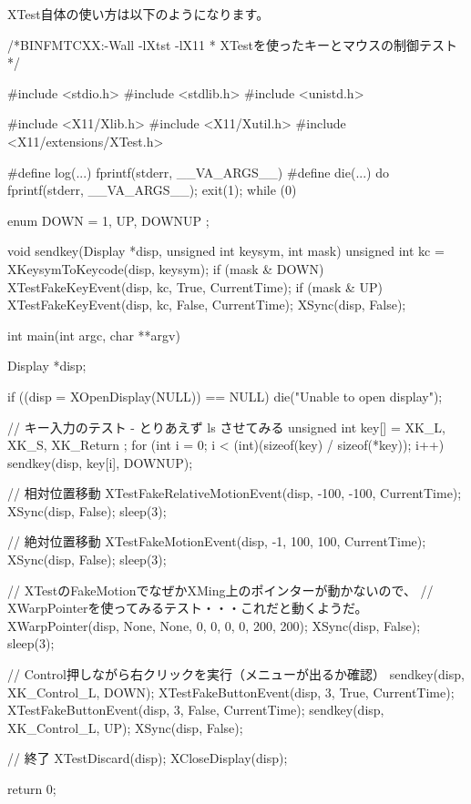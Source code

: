 \documentclass[mingoth,a4paper]{jsarticle}
\begin{document}
XTest自体の使い方は以下のようになります。
\begin{commandline}
/*BINFMTCXX:-Wall -lXtst -lX11
 * XTestを使ったキーとマウスの制御テスト
 */

#include <stdio.h>
#include <stdlib.h>
#include <unistd.h>

#include <X11/Xlib.h>
#include <X11/Xutil.h>
#include <X11/extensions/XTest.h>

#define log(...) fprintf(stderr, __VA_ARGS__)
#define die(...) do { fprintf(stderr, __VA_ARGS__); exit(1); } while (0)

enum { DOWN = 1, UP, DOWNUP };

void
sendkey(Display *disp, unsigned int keysym, int mask) {
    unsigned int kc = XKeysymToKeycode(disp, keysym);
    if (mask & DOWN) { XTestFakeKeyEvent(disp, kc, True, CurrentTime); }
    if (mask & UP)   { XTestFakeKeyEvent(disp, kc, False, CurrentTime); }
    XSync(disp, False);
}

int
main(int argc, char **argv) {
    Display *disp;

    if ((disp = XOpenDisplay(NULL)) == NULL) {
        die("Unable to open display\n");
    }

    // キー入力のテスト - とりあえず ls させてみる
    unsigned int key[] = { XK_L, XK_S, XK_Return };
    for (int i = 0; i < (int)(sizeof(key) / sizeof(*key)); i++) {
        sendkey(disp, key[i], DOWNUP);
    }

    // 相対位置移動
    XTestFakeRelativeMotionEvent(disp, -100, -100, CurrentTime);
    XSync(disp, False);
    sleep(3);

    // 絶対位置移動
    XTestFakeMotionEvent(disp, -1, 100, 100, CurrentTime);
    XSync(disp, False);
    sleep(3);

    // XTestのFakeMotionでなぜかXMing上のポインターが動かないので、
    // XWarpPointerを使ってみるテスト・・・これだと動くようだ。
    XWarpPointer(disp, None, None, 0, 0, 0, 0, 200, 200);
    XSync(disp, False);
    sleep(3);

    // Control押しながら右クリックを実行（メニューが出るか確認）
    sendkey(disp, XK_Control_L, DOWN);
    XTestFakeButtonEvent(disp, 3, True,  CurrentTime);
    XTestFakeButtonEvent(disp, 3, False, CurrentTime);
    sendkey(disp, XK_Control_L, UP);
    XSync(disp, False);

    // 終了
    XTestDiscard(disp);
    XCloseDisplay(disp);

    return 0;
}
\end{commandline}
\end{document}

